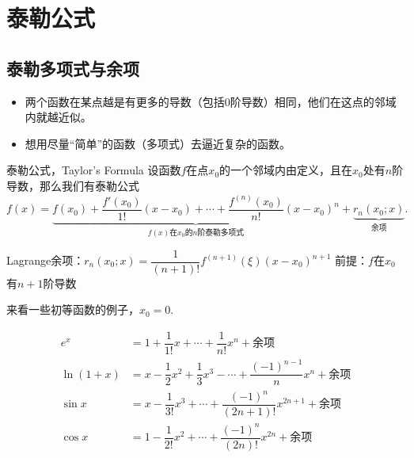 
\section{泰勒公式}


\subsection{泰勒多项式与余项}


\begin{frame}

\begin{itemize}
\item<1-> 两个函数在某点越是有更多的导数（包括$0$阶导数）相同，他们在这点的邻域内就越近似。
\item<2-> 想用尽量``简单''的函数（多项式）去逼近复杂的函数。
\end{itemize}

\pause

\begin{block}{泰勒公式，Taylor's Formula}
设函数$f$在点$x_0$的一个邻域内由定义，且在$x_0$处有$n$阶导数，那么我们有泰勒公式
{\small
$$f(x) = \underbrace{f(x_0) + \dfrac{f'(x_0)}{1!}(x-x_0) + \cdots + \dfrac{f^{(n)}(x_0)}{n!}(x-x_0)^n}_{\text{$f(x)$在$x_0$的$n$阶泰勒多项式}} + \underbrace{r_n(x_0;x)}_{\text{余项}}.$$
}
\end{block}

\pause

Lagrange余项：\quad $r_n(x_0;x) = \dfrac{1}{(n+1)!}f^{(n+1)}(\xi)(x-x_0)^{n+1}$\newline
前提：$f$在$x_0$有$n+1$阶导数

\end{frame}


\begin{frame}

来看一些初等函数的例子，$x_0=0.$

\pause

\begin{align*}
e^x & = 1 + \dfrac{1}{1!}x + \cdots + \dfrac{1}{n!}x^n + \text{余项} \\
\ln(1+x) & = x - \dfrac{1}{2}x^2 + \dfrac{1}{3}x^3 - \cdots + \dfrac{(-1)^{n-1}}{n}x^n + \text{余项} \\
\sin x & = x - \dfrac{1}{3!}x^3 + \cdots + \dfrac{(-1)^n}{(2n+1)!}x^{2n+1} + \text{余项} \\
\cos x & = 1 - \dfrac{1}{2!}x^2 + \cdots + \dfrac{(-1)^n}{(2n)!}x^{2n} + \text{余项} \\
\end{align*}

\end{frame}

